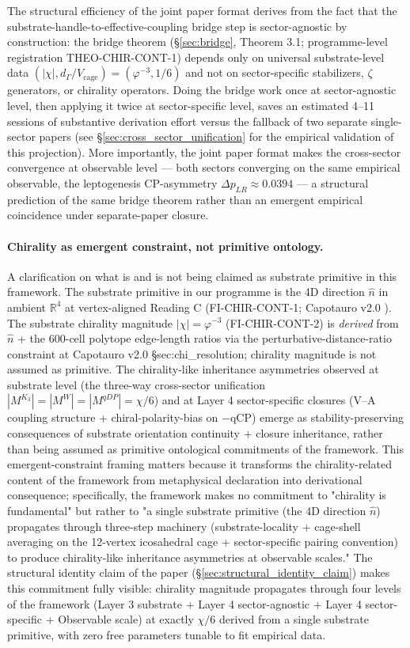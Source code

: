 \documentclass[11pt,letterpaper]{article}
\newcommand{\DeltapLR}{\Delta p_{LR}}
\newcommand{\Vcage}{V_{\text{cage}}}
\newcommand{\dGamma}{d_\Gamma}
\begin{document}
The structural efficiency of the joint paper format derives from the fact that the substrate-handle-to-effective-coupling bridge step is sector-agnostic by construction: the bridge theorem (§\ref{sec:bridge}, Theorem 3.1; programme-level registration THEO-CHIR-CONT-1) depends only on universal substrate-level data $(|\chi|, \dGamma/\Vcage) = (\varphi^{-3}, 1/6)$ and not on sector-specific stabilizers, $\zeta$ generators, or chirality operators. Doing the bridge work once at sector-agnostic level, then applying it twice at sector-specific level, saves an estimated 4--11 sessions of substantive derivation effort versus the fallback of two separate single-sector papers (see §\ref{sec:cross_sector_unification} for the empirical validation of this projection). More importantly, the joint paper format makes the cross-sector convergence at observable level --- both sectors converging on the same empirical observable, the leptogenesis CP-asymmetry $\DeltapLR \approx 0.0394$ --- a structural prediction of the same bridge theorem rather than an emergent empirical coincidence under separate-paper closure.

\paragraph{Chirality as emergent constraint, not primitive ontology.}
A clarification on what is and is not being claimed as substrate primitive in this framework. The substrate primitive in our programme is the 4D direction $\hat{n}$ in ambient $\mathbb{R}^4$ at vertex-aligned Reading C (FI-CHIR-CONT-1; Capotauro v2.0 \cite{Capotauro}). The substrate chirality magnitude $|\chi| = \varphi^{-3}$ (FI-CHIR-CONT-2) is \emph{derived} from $\hat{n}$ + the 600-cell polytope edge-length ratios via the perturbative-distance-ratio constraint at Capotauro v2.0 §sec:chi\_resolution; chirality magnitude is not assumed as primitive. The chirality-like inheritance asymmetries observed at substrate level (the three-way cross-sector unification $|M^{K_3}| = |M^W| = |M^{qDP}| = \chi/6$) and at Layer 4 sector-specific closures (V--A coupling structure + chiral-polarity-bias on $-$qCP) emerge as stability-preserving consequences of substrate orientation continuity + closure inheritance, rather than being assumed as primitive ontological commitments of the framework. This emergent-constraint framing matters because it transforms the chirality-related content of the framework from metaphysical declaration into derivational consequence; specifically, the framework makes no commitment to "chirality is fundamental" but rather to "a single substrate primitive (the 4D direction $\hat{n}$) propagates through three-step machinery (substrate-locality + cage-shell averaging on the 12-vertex icosahedral cage + sector-specific pairing convention) to produce chirality-like inheritance asymmetries at observable scales." The structural identity claim of the paper (§\ref{sec:structural_identity_claim}) makes this commitment fully visible: chirality magnitude propagates through four levels of the framework (Layer 3 substrate + Layer 4 sector-agnostic + Layer 4 sector-specific + Observable scale) at exactly $\chi/6$ derived from a single substrate primitive, with zero free parameters tunable to fit empirical data.
\end{document}
